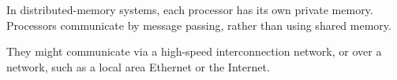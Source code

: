 

In distributed-memory systems, each processor has its own private memory.
Processors communicate by message passing, rather than using shared memory. 

%
%
They might communicate via a high-speed interconnection network, or over a
network, such as a local area Ethernet or the Internet.











